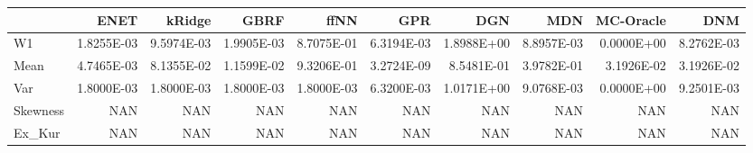 \begin{tabular}{lrrrrrrrrr}
\toprule
{} &       ENET &     kRidge &       GBRF &       ffNN &        GPR &        DGN &        MDN &  MC-Oracle &        DNM \\
\midrule
W1       & 1.8255E-03 & 9.5974E-03 & 1.9905E-03 & 8.7075E-01 & 6.3194E-03 & 1.8988E+00 & 8.8957E-03 & 0.0000E+00 & 8.2762E-03 \\
Mean     & 4.7465E-03 & 8.1355E-02 & 1.1599E-02 & 9.3206E-01 & 3.2724E-09 & 8.5481E-01 & 3.9782E-01 & 3.1926E-02 & 3.1926E-02 \\
Var      & 1.8000E-03 & 1.8000E-03 & 1.8000E-03 & 1.8000E-03 & 6.3200E-03 & 1.0171E+00 & 9.0768E-03 & 0.0000E+00 & 9.2501E-03 \\
Skewness &        NAN &        NAN &        NAN &        NAN &        NAN &        NAN &        NAN &        NAN &        NAN \\
Ex\_Kur   &        NAN &        NAN &        NAN &        NAN &        NAN &        NAN &        NAN &        NAN &        NAN \\
\bottomrule
\end{tabular}
